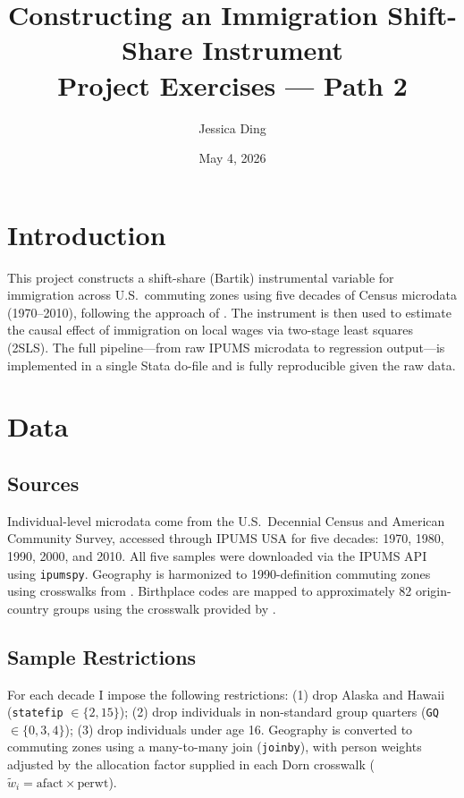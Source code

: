 \documentclass[12pt]{article}
\title{\textbf{Constructing an Immigration Shift-Share Instrument} \\
       \large Project Exercises --- Path 2}
\author{Jessica Ding}
\date{May 4, 2026}
\begin{document}
\maketitle

\section{Introduction}

This project constructs a shift-share (Bartik) instrumental variable for
immigration across U.S.\ commuting zones using five decades of Census
microdata (1970--2010), following the approach of
\citet{kim2024measuring}. The instrument is then used to estimate the
causal effect of immigration on local wages via two-stage least squares
(2SLS). The full pipeline---from raw IPUMS microdata to regression
output---is implemented in a single Stata do-file and is fully
reproducible given the raw data.

\section{Data}

\subsection{Sources}

Individual-level microdata come from the U.S.\ Decennial Census and
American Community Survey, accessed through IPUMS USA
\citep{ruggles2024ipums} for five decades: 1970, 1980, 1990, 2000, and
2010. All five samples were downloaded via the IPUMS API using
\texttt{ipumspy}. Geography is harmonized to 1990-definition commuting
zones using crosswalks from \citet{dorn2009essays}. Birthplace codes are
mapped to approximately 82 origin-country groups using the crosswalk
provided by \citet{kim2024measuring}.

\subsection{Sample Restrictions}

For each decade I impose the following restrictions: (1) drop Alaska and
Hawaii (\texttt{statefip} $\in \{2, 15\}$); (2) drop individuals in
non-standard group quarters (\texttt{GQ} $\in \{0, 3, 4\}$); (3) drop
individuals under age 16. Geography is converted to commuting zones using
a many-to-many join (\texttt{joinby}), with person weights adjusted by
the allocation factor supplied in each Dorn crosswalk
($\tilde{w}_i = \text{afact} \times \text{perwt}$).
\end{document}
